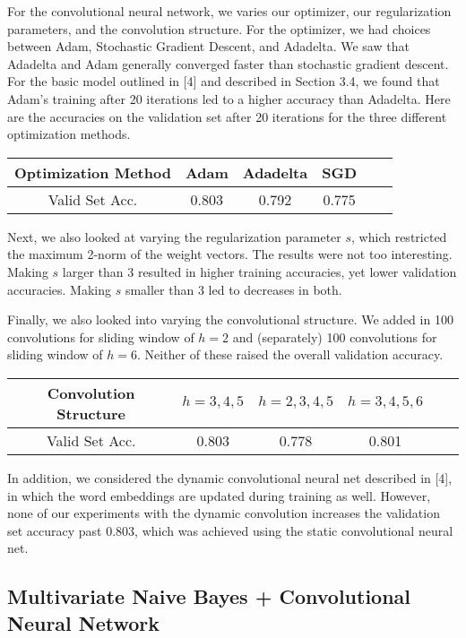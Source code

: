 \documentclass[11pt]{article}
\begin{document}
For the convolutional neural network, we varies our optimizer, our regularization parameters, and the convolution structure.  For the optimizer, we had choices between Adam, Stochastic Gradient Descent, and Adadelta.  We saw that Adadelta and Adam generally converged faster than stochastic gradient descent.  For the basic model outlined in [4] and described in Section 3.4, we found that Adam's training after 20 iterations led to a higher accuracy than Adadelta.  Here are the accuracies on the validation set after 20 iterations for the three different optimization methods.  

\begin{center}
\begin{tabular}{ c | c c c c c}
Optimization Method & Adam & Adadelta & SGD \\
\hline
Valid Set Acc. & 0.803 & 0.792 & 0.775
\end{tabular}
\end{center}

Next, we also looked at varying the regularization parameter $s$, which restricted the maximum 2-norm of the weight vectors.  The results were not too interesting.  Making $s$ larger than 3 resulted in higher training accuracies, yet lower validation accuracies.  Making $s$ smaller than 3 led to decreases in both.  

Finally, we also looked into varying the convolutional structure.  We added in 100 convolutions for sliding window of $h = 2$ and (separately) 100 convolutions for sliding window of $h = 6$.  Neither of these raised the overall validation accuracy. 

\begin{center}
\begin{tabular}{ c | c c c c c}
Convolution Structure & $h = 3, 4, 5$ & $h = 2, 3, 4, 5$ & $h = 3, 4, 5, 6$ \\
\hline
Valid Set Acc. & 0.803 & 0.778 & 0.801
\end{tabular}
\end{center}

In addition, we considered the dynamic convolutional neural net described in [4], in which the word embeddings are updated during training as well.  However, none of our experiments with the dynamic convolution increases the validation set accuracy past 0.803, which was achieved using the static convolutional neural net. 
   

\subsection{Multivariate Naive Bayes + Convolutional Neural Network}
\end{document}
